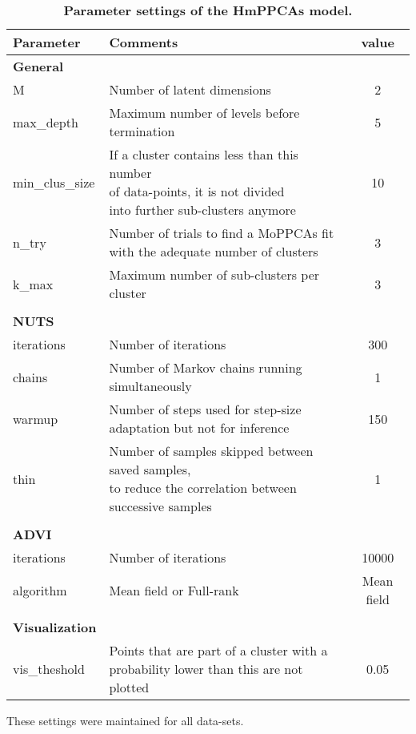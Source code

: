 \begin{table}
\caption[Parameter settings of the HmPPCAs model.]{\textbf{Parameter settings of the HmPPCAs model.}}
    \centering
    \begin{tabular}{l|l|c}
        Parameter & Comments & value \\
        \hline
        \textbf{General} & & \\
        M & Number of latent dimensions & 2 \\
        max\_depth & Maximum number of levels before termination & 5\\
        min\_clus\_size & \makecell[l]{If a cluster contains less than this number\\of data-points, it is not divided\\into further sub-clusters anymore} & 10 \\
        n\_try & \makecell[l]{Number of trials to find a MoPPCAs fit\\with the adequate number of clusters} & 3\\
        k\_max & Maximum number of sub-clusters per cluster & 3\\
         & & \\
        \textbf{NUTS} & & \\
        iterations & Number of iterations & 300\\
        chains & Number of Markov chains running simultaneously & 1\\
        warmup & \makecell[l]{Number of steps used for step-size\\adaptation but not for inference} & 150\\
        thin & \makecell[l]{Number of samples skipped between saved samples,\\to reduce the correlation between successive samples} & 1\\
        & & \\
        \textbf{ADVI} & & \\
        iterations & Number of iterations & 10000\\
        algorithm & Mean field or Full-rank & Mean field\\
        & & \\
        \textbf{Visualization} & & \\
        vis\_theshold & \makecell[l]{Points that are part of a cluster with a\\probability lower than this are not plotted} & 0.05\\
    \end{tabular}
    \small
    These settings were maintained for all data-sets.
    \label{tab:params}
\end{table}

